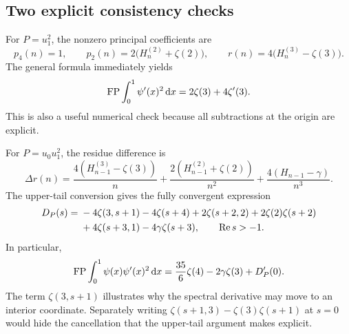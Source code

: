 \subsection{Two explicit consistency checks}

For $P=u_1^2$, the nonzero principal coefficients are
\[
 p_4(n)=1,\qquad p_2(n)=2\bigl(H_n^{(2)}+\zeta(2)\bigr),\qquad
 r(n)=4\bigl(H_n^{(3)}-\zeta(3)\bigr).
\]
The general formula immediately yields
\begin{equation}\label{spectral:trigammasquare}
 \operatorname{FP}\int_0^1\psi'(x)^2\,\mathrm d x
       =2\zeta(3)+4\zeta'(3).
\end{equation}
This is also a useful numerical check because all subtractions at the
origin are explicit.

For $P=u_0u_1^2$, the residue difference is
\[
 \Delta r(n)=\frac{4(H_{n-1}^{(3)}-\zeta(3))}{n}
       +\frac{2(H_{n-1}^{(2)}+\zeta(2))}{n^2}
       +\frac{4(H_{n-1}-\gamma)}{n^3}.
\]
The upper-tail conversion gives the fully convergent expression
\begin{align}\label{spectral:exampleDP}
 D_P(s)={}&-4\zeta(3,s+1)-4\zeta(s+4)
       +2\zeta(s+2,2)+2\zeta(2)\zeta(s+2)\notag\\
       &+4\zeta(s+3,1)-4\gamma\zeta(s+3),\qquad \operatorname{Re} s>-1.
\end{align}
In particular,
\begin{equation}\label{spectral:digamma_trigammasquare}
 \operatorname{FP}\int_0^1\psi(x)\psi'(x)^2\,\mathrm d x
       =\frac{35}{6}\zeta(4)-2\gamma\zeta(3)+D_P'(0).
\end{equation}
The term $\zeta(3,s+1)$ illustrates why the spectral derivative may
move to an interior coordinate.  Separately writing
$\zeta(s+1,3)-\zeta(3)\zeta(s+1)$ at $s=0$ would hide the cancellation
that the upper-tail argument makes explicit.
